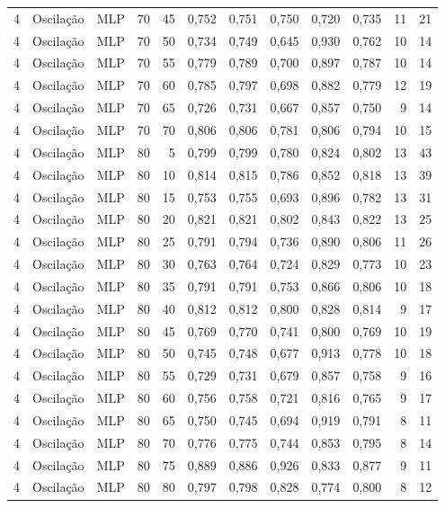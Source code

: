 \begin{longtable}{@{}rllrrrrrrrrr@{}}
4 & Oscilação & MLP & 70 & 45 & 0,752 & 0,751 & 0,750 & 0,720 & 0,735 & 11 & 21 \\
4 & Oscilação & MLP & 70 & 50 & 0,734 & 0,749 & 0,645 & 0,930 & 0,762 & 10 & 14 \\
4 & Oscilação & MLP & 70 & 55 & 0,779 & 0,789 & 0,700 & 0,897 & 0,787 & 10 & 14 \\
4 & Oscilação & MLP & 70 & 60 & 0,785 & 0,797 & 0,698 & 0,882 & 0,779 & 12 & 19 \\
4 & Oscilação & MLP & 70 & 65 & 0,726 & 0,731 & 0,667 & 0,857 & 0,750 & 9 & 14 \\
4 & Oscilação & MLP & 70 & 70 & 0,806 & 0,806 & 0,781 & 0,806 & 0,794 & 10 & 15 \\
4 & Oscilação & MLP & 80 & 5 & 0,799 & 0,799 & 0,780 & 0,824 & 0,802 & 13 & 43 \\
4 & Oscilação & MLP & 80 & 10 & 0,814 & 0,815 & 0,786 & 0,852 & 0,818 & 13 & 39 \\
4 & Oscilação & MLP & 80 & 15 & 0,753 & 0,755 & 0,693 & 0,896 & 0,782 & 13 & 31 \\
4 & Oscilação & MLP & 80 & 20 & 0,821 & 0,821 & 0,802 & 0,843 & 0,822 & 13 & 25 \\
4 & Oscilação & MLP & 80 & 25 & 0,791 & 0,794 & 0,736 & 0,890 & 0,806 & 11 & 26 \\
4 & Oscilação & MLP & 80 & 30 & 0,763 & 0,764 & 0,724 & 0,829 & 0,773 & 10 & 23 \\
4 & Oscilação & MLP & 80 & 35 & 0,791 & 0,791 & 0,753 & 0,866 & 0,806 & 10 & 18 \\
4 & Oscilação & MLP & 80 & 40 & 0,812 & 0,812 & 0,800 & 0,828 & 0,814 & 9 & 17 \\
4 & Oscilação & MLP & 80 & 45 & 0,769 & 0,770 & 0,741 & 0,800 & 0,769 & 10 & 19 \\
4 & Oscilação & MLP & 80 & 50 & 0,745 & 0,748 & 0,677 & 0,913 & 0,778 & 10 & 18 \\
4 & Oscilação & MLP & 80 & 55 & 0,729 & 0,731 & 0,679 & 0,857 & 0,758 & 9 & 16 \\
4 & Oscilação & MLP & 80 & 60 & 0,756 & 0,758 & 0,721 & 0,816 & 0,765 & 9 & 17 \\
4 & Oscilação & MLP & 80 & 65 & 0,750 & 0,745 & 0,694 & 0,919 & 0,791 & 8 & 11 \\
4 & Oscilação & MLP & 80 & 70 & 0,776 & 0,775 & 0,744 & 0,853 & 0,795 & 8 & 14 \\
4 & Oscilação & MLP & 80 & 75 & 0,889 & 0,886 & 0,926 & 0,833 & 0,877 & 9 & 11 \\
4 & Oscilação & MLP & 80 & 80 & 0,797 & 0,798 & 0,828 & 0,774 & 0,800 & 8 & 12 \\

\end{longtable}
